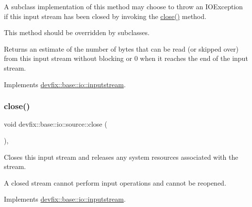 A subclass\textquotesingle{} implementation of this method may choose to throw an I\+O\+Exception if this input stream has been closed by invoking the \hyperlink{structdevfix_1_1base_1_1io_1_1source_aa00a381c8a166cbbc5dbf6de4b56590e}{close()} method.

This method should be overridden by subclasses.

\begin{DoxyReturn}{Returns}
an estimate of the number of bytes that can be read (or skipped over) from this input stream without blocking or 0 when it reaches the end of the input stream. 
\end{DoxyReturn}


Implements \hyperlink{structdevfix_1_1base_1_1io_1_1inputstream_ace04813af676b6c81fa452eb4d81a796}{devfix\+::base\+::io\+::inputstream}.

\mbox{\label{structdevfix_1_1base_1_1io_1_1source_aa00a381c8a166cbbc5dbf6de4b56590e}} 
\subsubsection{\texorpdfstring{close()}{close()}}
{\footnotesize\ttfamily void devfix\+::base\+::io\+::source\+::close (\begin{DoxyParamCaption}{ }\end{DoxyParamCaption})\hspace{0.3cm}{\ttfamily [override]}, {\ttfamily [virtual]}}



Closes this input stream and releases any system resources associated with the stream. 

A closed stream cannot perform input operations and cannot be reopened. 

Implements \hyperlink{structdevfix_1_1base_1_1io_1_1inputstream_a1188eff97757eb9625be91dfeca17af7}{devfix\+::base\+::io\+::inputstream}.

\mbox{\label{structdevfix_1_1base_1_1io_1_1source_a406834cf6651d48949b96d0ef49cc6c1}} 
